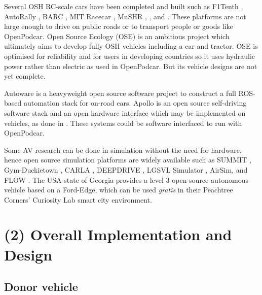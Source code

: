\documentclass[a4paper]{article}
\begin{document}
	Several OSH RC-scale cars have been completed and built such as F1Tenth \cite{f1tenth}, AutoRally \cite{goldfain2019autorally}, BARC \cite{gonzales2018planning}, MIT Racecar \cite{mit}, MuSHR \cite{mushr},  \cite{nakamoto2019development}, and \cite{vincke2021open}. These platforms are not large enough to drive on public roads or to transport people or goods like OpenPodcar. Open Source Ecology (OSE) \cite{jakubowski2003open} is an ambitious project which ultimately aims to develop fully OSH vehicles including a car and tractor. OSE is optimised for reliability and for users in developing countries so it uses hydraulic power rather than electric as used in OpenPodcar. But its vehicle designs are not yet complete.
	
	Autoware \cite{kato2018autoware} is a heavyweight open source software project to construct a full ROS-based automation stack for on-road cars. Apollo \cite{apolloautoapollo} is an open source self-driving software stack and an open hardware interface which may be implemented on vehicles, as done in \cite{kessler2019bridging}. These systems could be software interfaced to run with OpenPodcar. 
	
	Some AV research can be done in simulation without the need for hardware, hence open source simulation platforms are widely available such as SUMMIT \cite{cai2020summit}, Gym-Duckietown \cite{chevalier-boisvert2018duckietown}, CARLA \cite{dosovitskiy2017carla}, DEEPDRIVE \cite{quiterdeepdrive}, LGSVL Simulator \cite{rong2020lgsvl}, AirSim\cite{shah2017airsim}, and FLOW \cite{wu2017flow}. The USA state of Georgia provides a level 3 open-source autonomous vehicle based on a Ford-Edge\cite{peachtreecuriosity}, which can be used {\em gratis} in their Peachtree Corners' Curiosity Lab smart city environment.
	
	\section{(2) Overall Implementation and Design}\label{h.1u7vph94gfbt}
	
	\subsection{Donor vehicle}
	
\end{document}
